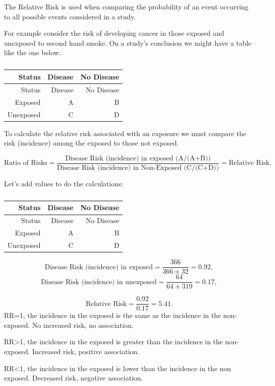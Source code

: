 \documentclass[
]{book}
\begin{document}
The Relative Risk is used when comparing the probability of an event occurring to all possible events considered in a study.

For example consider the risk of developing cancer in those exposed and unexposed to second hand smoke. On a study's conclusion we might have a table like the one below:

\begin{longtable}[]{@{}rrr@{}}
\caption{\label{tab:table14}}\tabularnewline
\toprule
Status & Disease & No Disease \\
\midrule
\endfirsthead
\toprule
Status & Disease & No Disease \\
\midrule
\endhead
Exposed & A & B \\
Unexposed & C & D \\
\bottomrule
\end{longtable}

To calculate the relative risk associated with an exposure we must compare the risk (incidence) among the exposed to those not exposed.

\[\textrm{Ratio of Risks} = \frac{\textrm{Disease Risk (incidence) in exposed (A/(A+B))}}{ \textrm{Disease Risk (incidence) in Non-Exposed (C/(C+D))}} = \textrm{Relative Risk}. \]

Let's add values to do the calculations:

\begin{longtable}[]{@{}rrr@{}}
\caption{\label{tab:table15}}\tabularnewline
\toprule
Status & Disease & No Disease \\
\midrule
\endfirsthead
\toprule
Status & Disease & No Disease \\
\midrule
\endhead
Exposed & A & B \\
Unexposed & C & D \\
\bottomrule
\end{longtable}

\[\textrm{Disease Risk (incidence) in exposed}=\frac{366}{366+32}=0.92,\]
\[\textrm{Disease Risk (incidence) in unexposed}=\frac{64}{64+319}=0.17,\]

\[\textrm{Relative Risk}=\frac{0.92}{0.17}=5.41.\]
RR=1, the incidence in the exposed is the same as the incidence in the non-exposed. No increased risk, no association.

RR\textgreater1, the incidence in the exposed is greater than the incidence in the non-exposed. Increased risk, positive association.

RR\textless1, the incidence in the exposed is lower than the incidence in the non exposed. Decreased risk, negative association.
\end{document}
